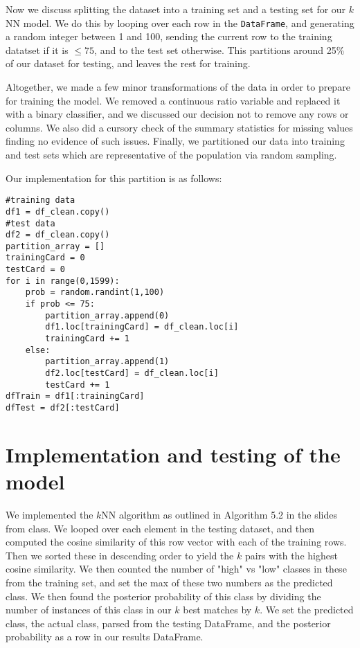 \documentclass[11pt,oneside,reqno]{amsart}
\theoremstyle{plain}
\theoremstyle{definition}
\theoremstyle{remark}
\newcommand{\inlinecode}{\texttt}
\begin{document}
Now we discuss splitting the dataset into a training set and a testing set for our $k$NN model. We do this by looping over each row in the \inlinecode{DataFrame}, and generating a random integer between 1 and 100, sending the current row to the training datatset if it is $\leq 75$, and to the test set otherwise. This partitions around 25\% of our dataset for testing, and leaves the rest for training. 

Altogether, we made a few minor transformations of the data in order to prepare for training the model. We removed a continuous ratio variable and replaced it with a binary classifier, and we discussed our decision not to remove any rows or columns. We also did a cursory check of the summary statistics for missing values finding no evidence of such issues. Finally, we partitioned our data into training and test sets which are representative of the population via random sampling. 

Our implementation for this partition is as follows:
\begin{framed}
\begin{verbatim}
#training data
df1 = df_clean.copy()
#test data
df2 = df_clean.copy()
partition_array = []
trainingCard = 0
testCard = 0
for i in range(0,1599):
    prob = random.randint(1,100)
    if prob <= 75:
        partition_array.append(0)
        df1.loc[trainingCard] = df_clean.loc[i]
        trainingCard += 1
    else: 
        partition_array.append(1)
        df2.loc[testCard] = df_clean.loc[i]
        testCard += 1
dfTrain = df1[:trainingCard]
dfTest = df2[:testCard]
\end{verbatim}
\end{framed}

\section{Implementation and testing of the model}

We implemented the $k$NN algorithm as outlined in Algorithm 5.2 in the slides from class. We looped over each element in the testing dataset, and then computed the cosine similarity of this row vector with each of the training rows. Then we sorted these in descending order to yield the $k$ pairs with the highest cosine similarity. We then counted the number of "high" vs "low" classes in these from the training set, and set the max of these two numbers as the predicted class. We then found the posterior probability of this class by dividing the number of instances of this class in our $k$ best matches by $k$. We set the predicted class, the actual class, parsed from the testing DataFrame, and the posterior probability as a row in our results DataFrame. 
\end{document}
